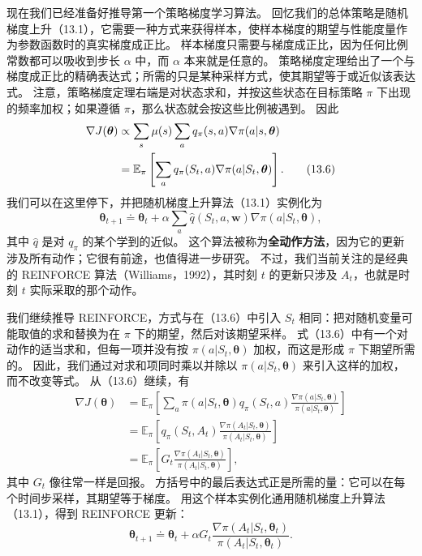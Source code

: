 \documentclass[UTF8,12pt,a4paper,fontset=fandol]{ctexart}
\begin{document}
现在我们已经准备好推导第一个策略梯度学习算法。
回忆我们的总体策略是随机梯度上升（13.1），它需要一种方式来获得样本，使样本梯度的期望与性能度量作为参数函数时的真实梯度成正比。
样本梯度只需要与梯度成正比，因为任何比例常数都可以吸收到步长 $\alpha$ 中，而 $\alpha$ 本来就是任意的。
策略梯度定理给出了一个与梯度成正比的精确表达式；所需的只是某种采样方式，使其期望等于或近似该表达式。
注意，策略梯度定理右端是对状态求和，并按这些状态在目标策略 $\pi$ 下出现的频率加权；如果遵循 $\pi$，那么状态就会按这些比例被遇到。
因此
\begin{align}
\nabla J(\boldsymbol{\theta})
&\propto \sum_s \mu(s)\sum_a q_\pi(s,a)\nabla\pi(a|s,\boldsymbol{\theta})\notag\\
&=\mathbb{E}_\pi\left[\sum_a q_\pi(S_t,a)\nabla\pi(a|S_t,\boldsymbol{\theta})\right].
\tag{13.6}
\end{align}
我们可以在这里停下，并把随机梯度上升算法（13.1）实例化为
\begin{equation}
\boldsymbol{\theta}_{t+1}\doteq \boldsymbol{\theta}_t+\alpha\sum_a \hat q(S_t,a,\mathbf{w})\nabla\pi(a|S_t,\boldsymbol{\theta}),
\tag{13.7}
\end{equation}
其中 $\hat q$ 是对 $q_\pi$ 的某个学到的近似。
这个算法被称为\textbf{全动作方法}，因为它的更新涉及所有动作；它很有前途，也值得进一步研究。
不过，我们当前关注的是经典的 REINFORCE 算法（Williams，1992），其时刻 $t$ 的更新只涉及 $A_t$，也就是时刻 $t$ 实际采取的那个动作。

我们继续推导 REINFORCE，方式与在（13.6）中引入 $S_t$ 相同：把对随机变量可能取值的求和替换为在 $\pi$ 下的期望，然后对该期望采样。
式（13.6）中有一个对动作的适当求和，但每一项并没有按 $\pi(a|S_t,\boldsymbol{\theta})$ 加权，而这是形成 $\pi$ 下期望所需的。
因此，我们通过对求和项同时乘以并除以 $\pi(a|S_t,\boldsymbol{\theta})$ 来引入这样的加权，而不改变等式。
从（13.6）继续，有
\begin{align*}
\nabla J(\boldsymbol{\theta})
&=\mathbb{E}_\pi\left[\sum_a \pi(a|S_t,\boldsymbol{\theta})q_\pi(S_t,a)
\frac{\nabla\pi(a|S_t,\boldsymbol{\theta})}{\pi(a|S_t,\boldsymbol{\theta})}\right]\\
&=\mathbb{E}_\pi\left[q_\pi(S_t,A_t)
\frac{\nabla\pi(A_t|S_t,\boldsymbol{\theta})}{\pi(A_t|S_t,\boldsymbol{\theta})}\right]\\
&=\mathbb{E}_\pi\left[G_t
\frac{\nabla\pi(A_t|S_t,\boldsymbol{\theta})}{\pi(A_t|S_t,\boldsymbol{\theta})}\right],
\end{align*}
其中 $G_t$ 像往常一样是回报。
方括号中的最后表达式正是所需的量：它可以在每个时间步采样，其期望等于梯度。
用这个样本实例化通用随机梯度上升算法（13.1），得到 REINFORCE 更新：
\begin{equation}
\boldsymbol{\theta}_{t+1}\doteq \boldsymbol{\theta}_t+\alpha G_t
\frac{\nabla\pi(A_t|S_t,\boldsymbol{\theta}_t)}{\pi(A_t|S_t,\boldsymbol{\theta}_t)}.
\tag{13.8}
\end{equation}
\end{document}
